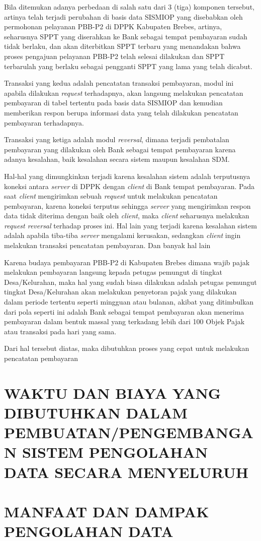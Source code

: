 \documentclass[pdftex,12pt, oneside]{article}
\begin{document}
Bila ditemukan adanya perbedaan di salah satu dari 3 (tiga) komponen tersebut, artinya telah terjadi perubahan di basis data SISMIOP yang disebabkan oleh permohonan pelayanan PBB-P2 di DPPK Kabupaten Brebes, artinya, seharusnya SPPT yang diserahkan ke Bank sebagai tempat pembayaran sudah tidak berlaku, dan akan diterbitkan SPPT terbaru yang menandakan bahwa proses pengajuan pelayanan PBB-P2 telah selesai dilakukan dan SPPT terbarulah yang berlaku sebagai pengganti SPPT yang lama yang telah dicabut.

Transaksi yang kedua adalah pencatatan transaksi pembayaran, modul ini apabila dilakukan \textit{request} terhadapnya, akan langsung melakukan pencatatan pembayaran di tabel tertentu pada basis data SISMIOP dan kemudian memberikan respon berupa informasi data yang telah dilakukan pencatatan pembayaran terhadapnya.

Transaksi yang ketiga adalah modul \textit{reversal}, dimana terjadi pembatalan pembayaran yang dilakukan oleh Bank sebagai tempat pembayaran karena adanya kesalahan, baik kesalahan secara sistem maupun kesalahan SDM. 

Hal-hal yang dimungkinkan terjadi karena kesalahan sistem adalah terputusnya koneksi antara \textit{server} di DPPK dengan \textit{client} di Bank tempat pembayaran. Pada saat \textit{client} mengirimkan sebuah \textit{request} untuk melakukan pencatatan pembayaran, karena koneksi terputus sehingga \textit{server} yang mengirimkan respon data tidak diterima dengan baik oleh \textit{client}, maka \textit{client} seharusnya melakukan \textit{request reversal} terhadap proses ini. Hal lain yang terjadi karena kesalahan sistem adalah apabila tiba-tiba \textit{server} mengalami kerusakan, sedangkan \textit{client} ingin melakukan transaksi pencatatan pembayaran. Dan banyak hal lain 

Karena budaya pembayaran PBB-P2 di Kabupaten Brebes dimana wajib pajak melakukan pembayaran langsung kepada petugas pemungut di tingkat Desa/Kelurahan, maka hal yang sudah biasa dilakukan adalah petugas pemungut tingkat Desa/Kelurahan akan melakukan penyetoran pajak yang dilakukan dalam periode tertentu seperti mingguan atau bulanan, akibat yang ditimbulkan dari pola seperti ini adalah Bank sebagai tempat pembayaran akan menerima pembayaran dalam bentuk massal yang terkadang lebih dari 100 Objek Pajak atau transaksi pada hari yang sama. 

Dari hal tersebut diatas, maka dibutuhkan proses yang cepat untuk melakukan pencatatan pembayaran 


\section{WAKTU DAN BIAYA YANG DIBUTUHKAN DALAM PEMBUATAN/PENGEMBANGAN SISTEM PENGOLAHAN DATA SECARA MENYELURUH}


\section{MANFAAT DAN DAMPAK PENGOLAHAN DATA}
\end{document}
